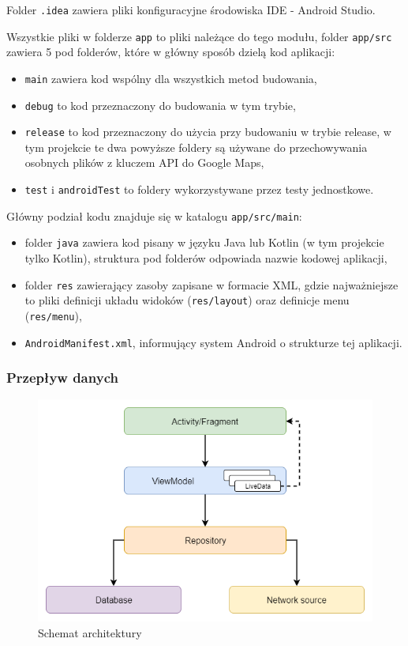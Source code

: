 \documentclass[polish,polish,a4paper,12pt]{article}
\begin{document}
		Folder \texttt{.idea} zawiera pliki konfiguracyjne środowiska IDE - Android Studio.

		Wszystkie pliki w folderze \texttt{app} to pliki należące do tego modułu, folder \texttt{app/src} zawiera 5 pod folderów, które w główny sposób dzielą kod aplikacji:

		\begin{itemize}
			\item \texttt{main} zawiera kod wspólny dla wszystkich metod budowania,
			\item \texttt{debug} to kod przeznaczony do budowania w tym trybie,
			\item \texttt{release} to kod przeznaczony do użycia przy budowaniu w trybie release, w tym projekcie te dwa powyższe foldery są używane do przechowywania osobnych plików z kluczem API do Google Maps,
			\item \texttt{test} i \texttt{androidTest} to foldery wykorzystywane przez testy jednostkowe.
		\end{itemize}

		Główny podział kodu znajduje się w katalogu \texttt{app/src/main}:

		\begin{itemize}
			\item folder \texttt{java} zawiera kod pisany w języku Java lub Kotlin (w tym projekcie tylko Kotlin), struktura pod folderów odpowiada nazwie kodowej aplikacji,
			\item folder \texttt{res} zawierający zasoby zapisane w formacie XML, gdzie najważniejsze to pliki definicji układu widoków (\texttt{res/layout}) oraz definicje menu (\texttt{res/menu}),
			\item \texttt{AndroidManifest.xml}, informujący system Android o strukturze tej aplikacji.
		\end{itemize}

		\subsubsection{Przepływ danych}

		\begin{figure}[H]
			\centering
			\includegraphics[width = \textwidth]{architecture}
			\caption{Schemat architektury}
			\label{fig:architecture}
		\end{figure}
\end{document}
